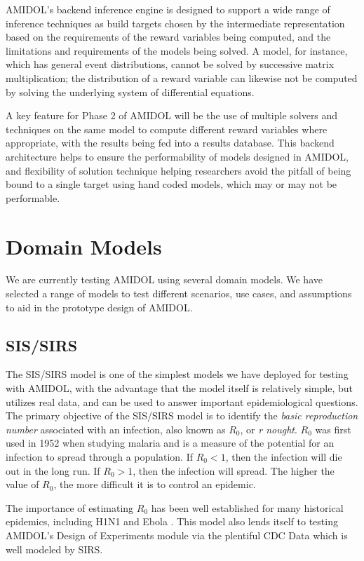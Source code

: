 \documentclass[11pt]{article}
\newcommand{\amidol}{\textsc{AMIDOL}}
\begin{document}
\amidol{}'s backend inference engine is designed to support a wide range of inference techniques as build targets chosen by the intermediate representation based on the requirements of the reward variables being computed, and the limitations and requirements of the models being solved.  A model, for instance, which has general event distributions, cannot be solved by successive matrix multiplication; the distribution of a reward variable can likewise not be computed by solving the underlying system of differential equations.

A key feature for Phase 2 of \amidol{} will be the use of multiple solvers and techniques on the same model to compute different reward variables where appropriate, with the results being fed into a results database.  This  backend architecture helps to ensure the performability of models designed in \amidol{}, and flexibility of solution technique helping researchers avoid the pitfall of being bound to a single target using hand coded models, which may or may not be performable.


\section{Domain Models}

We are currently testing \amidol{} using several domain models.  We have selected a range of models to test different scenarios, use cases, and assumptions to aid in the prototype design of \amidol{}.

\subsection{SIS/SIRS}

The SIS/SIRS model is one of the simplest models we have deployed for testing with \amidol{}, with the advantage that the model itself is relatively simple, but utilizes real data, and can be used to answer important epidemiological questions.  The primary objective of the SIS/SIRS model is to identify the \emph{basic reproduction number} associated with an infection, also known as $R_0$, or \emph{r nought}.  $R_0$ was first used in 1952 when studying malaria and is a measure of the potential for an infection to spread through a population.  If $R_0 < 1$, then the infection will die out in the long run.  If $R_0 > 1$, then the infection will spread.  The higher the value of $R_0$, the more difficult it is to control an epidemic.

The importance of estimating $R_0$ has been well established for many historical epidemics, including H1N1 \cite{fraser2009pandemic} and Ebola \cite{fisman2014early}.  This model also lends itself to testing \amidol{}'s Design of Experiments module via the plentiful CDC Data \cite{cdc2019fluview} which is well modeled by SIRS.
\end{document}
